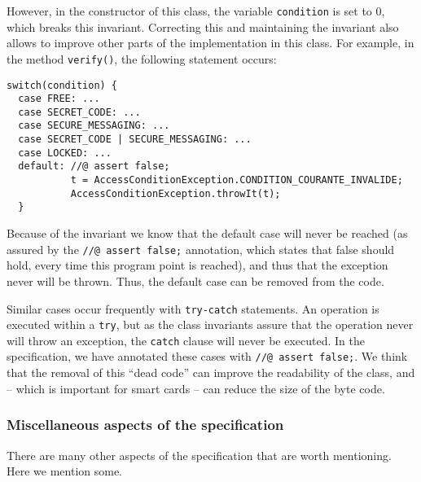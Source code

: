\documentclass[a4paper]{llncs}
\begin{document}
However, in the constructor of this class, the variable
\texttt{condition} is set to 0, which breaks this
invariant. Correcting this and maintaining the invariant also allows
to improve other parts of the implementation in this class. For
example, in the method \texttt{verify()}, the following statement
occurs:
\begin{verbatim}
switch(condition) {
  case FREE: ...
  case SECRET_CODE: ...
  case SECURE_MESSAGING: ...
  case SECRET_CODE | SECURE_MESSAGING: ...
  case LOCKED: ...
  default: //@ assert false;
           t = AccessConditionException.CONDITION_COURANTE_INVALIDE;
           AccessConditionException.throwIt(t);
  }
\end{verbatim}
Because of the invariant we know that the default case will never
be reached (as assured by the \texttt{//@ assert false;} annotation,
which states that false should hold, every time this program point is
reached), and thus that the exception never will be thrown. Thus, the
default case can be removed from the code.

Similar cases occur frequently with \texttt{try-catch} statements. An
operation is executed within a \texttt{try}, but as the class invariants
assure that the operation never will throw an exception, the
\texttt{catch} clause will never be executed. In the specification, we 
have annotated these cases with \texttt{//@ assert false;}. We think
that the removal of this ``dead code'' can improve the readability of
the class, and -- which is important for smart cards -- can reduce the 
size of the byte code.


\subsubsection{Miscellaneous aspects of the specification}
There are many other aspects of the specification that are worth
mentioning. Here we mention some.
\end{document}

